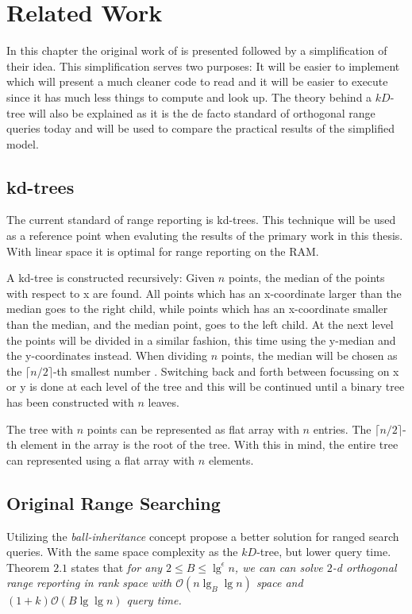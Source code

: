 \chapter{Related Work}
\label{ch:relatedwork}

In this chapter the original work of \citet{chanetal} is presented followed by a simplification of their idea. This simplification serves two purposes: It will be easier to implement which will present a much cleaner code to read and it will be easier to execute since it has much less things to compute and look up. The theory behind a $kD$-tree will also be explained as it is the de facto standard of orthogonal range queries today and will be used to compare the practical results of the simplified model.

\section{kd-trees}

The current standard of range reporting is kd-trees. This technique will be used as a reference point when evaluting the results of the primary work in this thesis. With linear space it is optimal for range reporting on the RAM.

A kd-tree is constructed recursively: Given $n$ points, the median of the points with respect to x are found. All points which has an x-coordinate larger than the median goes to the right child, while points which has an x-coordinate smaller than the median, and the median point, goes to the left child. At the next level the points will be divided in a similar fashion, this time using the y-median and the y-coordinates instead. When dividing $n$ points, the median will be chosen as the $\lceil n/2 \rceil$-th smallest number \cite{compgeo}.
Switching back and forth between focussing on x or y is done at each level of the tree and this will be continued until a binary tree has been constructed with $n$ leaves.

The tree with $n$ points can be represented as flat array with $n$ entries. The $\lceil n/2 \rceil$-th element in the array is the root of the tree.
 With this in mind, the entire tree can represented using a flat array with $n$ elements. 




\section{Original Range Searching}
\label{sect:original}
Utilizing the \emph{ball-inheritance} concept \citeauthor{chanetal} propose a better solution for ranged search queries. With the same space complexity as the $kD$-tree, but lower query time. Theorem $2.1$ states that \emph{for any $2 \leq B \leq \lg^\epsilon n$, we can can solve $2$-d orthogonal range reporting in rank space with $\mathcal{O}(n \lg_B \lg n)$ space and $(1+k)\mathcal{O}(B \lg \lg n)$ query time.}

